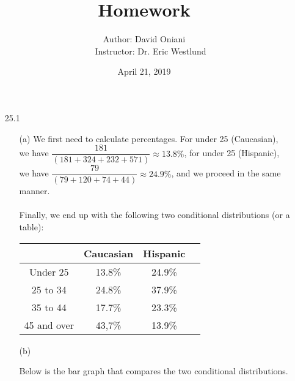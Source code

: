 \documentclass[11pt, a4paper]{article}
\title{\bf{Homework \textnumero 18}}
\author{Author: David Oniani
\\
\ \ \ Instructor: Dr. Eric Westlund}
\date{April 21, 2019}
\begin{document}
\maketitle
\begin{itemize}
\item[25.1]
\begin{itemize}
\item[(a)]
We first need to calculate percentages.
For under 25 (Caucasian), \\ we have $\dfrac{181}{(181 + 324 + 232 + 571)} \approx 13.8\%$,
for under 25 (Hispanic), \\ we have $\dfrac{79}{(79 + 120 + 74 + 44)} \approx 24.9\%$,
and we proceed in the same manner.\\\\
Finally, we end up with the following two conditional distributions (or a table):\\
\begin{center}
    \begin{tabular}{ |c|c|c|c| }
    \hline
     & Caucasian & Hispanic\\
    \hline
    Under 25    & 13.8\% & 24.9\%\\
    25 to 34    & 24.8\% & 37.9\%\\
    35 to 44    & 17.7\% & 23.3\%\\
    45 and over & 43,7\% & 13.9\%\\
    \hline
    \end{tabular}
\end{center}

\item[]

\item[(b)]
\item[]
Below is the bar graph that compares the two conditional distributions.
\item[]
\item[]
\end{itemize}
\end{itemize}
\end{document}
